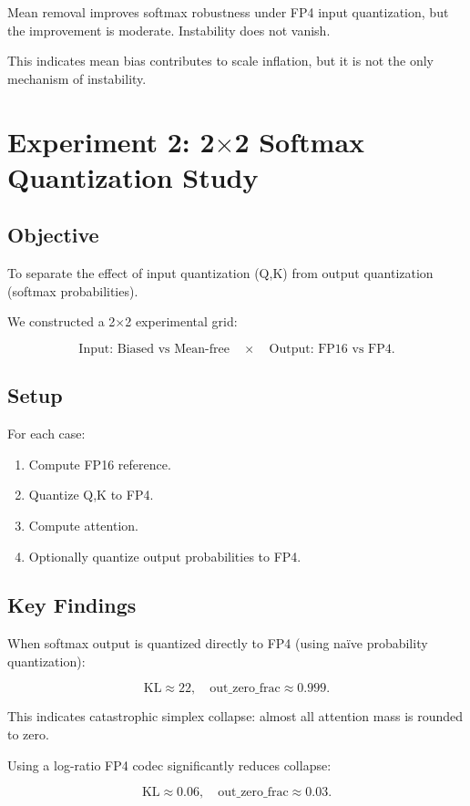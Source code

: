 Mean removal improves softmax robustness under FP4 input quantization,
but the improvement is moderate. Instability does not vanish.

This indicates mean bias contributes to scale inflation,
but it is not the only mechanism of instability.

\section{Experiment 2: 2$\times$2 Softmax Quantization Study}

\subsection{Objective}

To separate the effect of input quantization (Q,K)
from output quantization (softmax probabilities).

We constructed a 2$\times$2 experimental grid:

\[
\text{Input: Biased vs Mean-free}
\quad \times \quad
\text{Output: FP16 vs FP4}.
\]

\subsection{Setup}

For each case:

\begin{enumerate}
\item Compute FP16 reference.
\item Quantize Q,K to FP4.
\item Compute attention.
\item Optionally quantize output probabilities to FP4.
\end{enumerate}

\subsection{Key Findings}

When softmax output is quantized directly to FP4
(using naïve probability quantization):

\[
\text{KL} \approx 22,
\quad
\text{out\_zero\_frac} \approx 0.999.
\]

This indicates catastrophic simplex collapse:
almost all attention mass is rounded to zero.

Using a log-ratio FP4 codec significantly reduces collapse:

\[
\text{KL} \approx 0.06,
\quad
\text{out\_zero\_frac} \approx 0.03.
\]

